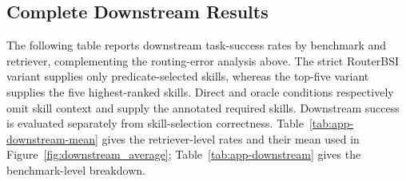 \subsection{Complete Downstream Results}
The following table reports downstream task-success rates by benchmark and retriever, complementing the routing-error analysis above. The strict RouterBSI variant supplies only predicate-selected skills, whereas the top-five variant supplies the five highest-ranked skills. Direct and oracle conditions respectively omit skill context and supply the annotated required skills. Downstream success is evaluated separately from skill-selection correctness.
Table~\ref{tab:app-downstream-mean} gives the retriever-level rates and their mean used in Figure~\ref{fig:downstream_average}; Table~\ref{tab:app-downstream} gives the benchmark-level breakdown.


